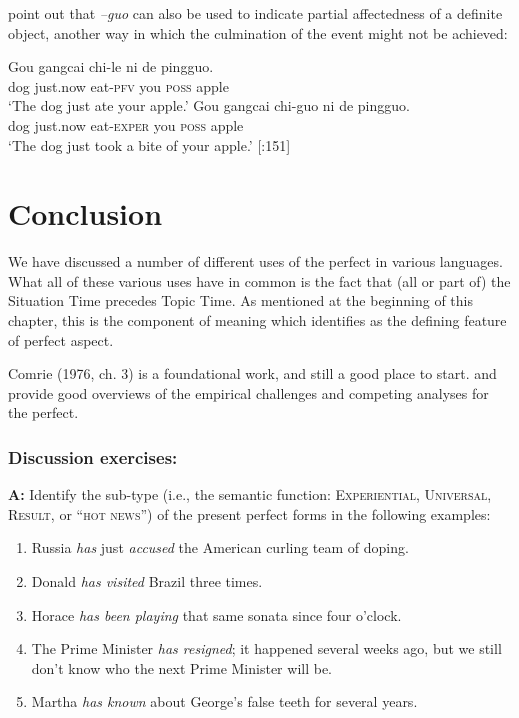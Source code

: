 \citet{HuangDavis1989} point out that \textit{–guo} can also be used to indicate partial affectedness of a definite object, another way in which the culmination of the event might not be achieved:


\ea
\ea \gll  Gou  gangcai  chi-le  ni  de  pingguo.\\
dog  just.now  eat-\textsc{pfv}  you  \textsc{poss}  apple\\
\glt ‘The dog just ate your apple.’
\ex \gll  Gou  gangcai  chi-guo  ni  de  pingguo.\\
dog  just.now  eat-\textsc{exper}  you  \textsc{poss}  apple\\
\glt ‘The dog just took a bite of your apple.’  [\citealt{HuangDavis1989}:151]
\z \z

\section{Conclusion}\label{sec:22.7}

We have discussed a number of different uses of the perfect in various languages. What all of these various uses have in common is the fact that (all or part of) the Situation Time precedes Topic Time. As mentioned at the beginning of this chapter, this is the component of meaning which \citet{Klein1992} identifies as the defining feature of perfect aspect.



\furtherreading



Comrie (1976, ch. 3) is a foundational work, and still a good place to start. \citet{Portner2011} and \citet{Ritz2012} provide good overviews of the empirical challenges and competing analyses for the perfect.


\subsubsection{Discussion exercises:}\label{sec:}

\textbf{A:} Identify the sub-type (i.e., the semantic function: \textsc{Experiential, Universal, Result}, or “\textsc{hot news}”) of the present perfect forms in the following examples:

\begin{enumerate}
\item Russia \textit{has} just \textit{accused} the American curling team of doping.
\item Donald \textit{has visited} Brazil three times.
\item Horace \textit{has been playing} that same sonata since four o’clock.
\item The Prime Minister \textit{has resigned}; it happened several weeks ago, but we still don’t know who the next Prime Minister will be.
\item Martha \textit{has known} about George’s false teeth for several years.
\end{enumerate}
